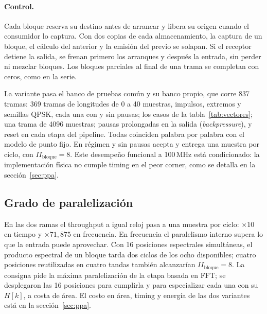\paragraph{Control.} Cada bloque reserva su destino antes de arrancar y libera su origen cuando el consumidor lo captura. Con dos copias de cada almacenamiento, la captura de un bloque, el cálculo del anterior y la emisión del previo se solapan. Si el receptor detiene la salida, se frenan primero los arranques y después la entrada, sin perder ni mezclar bloques. Los bloques parciales al final de una trama se completan con ceros, como en la serie.

La variante pasa el banco de pruebas común y su banco propio, que corre 837 tramas: 369 tramas de longitudes de 0 a 40 muestras, impulsos, extremos y semillas QPSK, cada una con y sin pausas; los casos de la tabla~\ref{tab:vectores}; una trama de 4096 muestras; pausas prolongadas en la salida (\emph{backpressure}), y reset en cada etapa del pipeline. Todas coinciden palabra por palabra con el modelo de punto fijo. En régimen y sin pausas acepta y entrega una muestra por ciclo, con $II_\text{bloque} = 8$. Este desempeño funcional a 100\,MHz está condicionado: la implementación física no cumple timing en el peor corner, como se detalla en la sección~\ref{sec:ppa}.

\subsection{Grado de paralelización}

En las dos ramas el throughput a igual reloj pasa a una muestra por ciclo: $\times 10$ en tiempo y $\times 71{,}875$ en frecuencia. En frecuencia el paralelismo interno supera lo que la entrada puede aprovechar. Con 16 posiciones espectrales simultáneas, el producto espectral de un bloque tarda dos ciclos de los ocho disponibles; cuatro posiciones reutilizadas en cuatro tandas también alcanzarían $II_\text{bloque} = 8$. La consigna pide la máxima paralelización de la etapa basada en FFT; se desplegaron las 16 posiciones para cumplirla y para especializar cada una con su $H[k]$, a costa de área. El costo en área, timing y energía de las dos variantes está en la sección~\ref{sec:ppa}.
